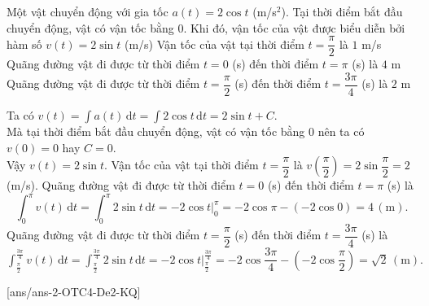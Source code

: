 \begin{ex}%
	Một vật chuyển động với gia tốc $a(t)=2\cos t$ (m/s$^2$).
	\choiceTF
	{Tại thời điểm bắt đầu chuyển động, vật có vận tốc bằng $0$. Khi đó, vận tốc của vật được biểu diễn bởi hàm số $v(t)=2\sin t$ (m/s)}
	{Vận tốc của vật tại thời điểm $t=\dfrac{\pi}{2}$ là $1$ m/s}
	{Quãng đường vật đi được từ thời điểm $t=0$ (s) đến thời điểm $t=\pi$ (s) là $4$ m}
	{Quãng đường vật đi được từ thời điểm $t=\dfrac{\pi}{2}$ (s) đến thời điểm $t=\dfrac{3\pi}{4}$ (s) là $2$ m}
	\loigiai
	{\begin{itemchoice}
	\itemch Ta có $v(t)=\displaystyle\int a(t) \mathrm{\,d}t=\displaystyle\int 2\cos t \mathrm{\,d}t=2\sin t+C$. \\
	Mà tại thời điểm bắt đầu chuyển động, vật có vận tốc bằng 0 nên ta có $v(0)=0$ hay $C=0$. \\
	Vậy $v(t)=2\sin t$.
	\itemch Vận tốc của vật tại thời điểm $t=\dfrac{\pi}{2}$ là $v\left(\dfrac{\pi}{2}\right)=2\sin \dfrac{\pi}{2}=2$ (m/s).
	\itemch Quãng đường vật đi được từ thời điểm $t=0$ (s) đến thời điểm $t=\pi$ (s) là
	$$
	\displaystyle\int_0^\pi v(t) \mathrm{\,d}t=\displaystyle\int_0^\pi 2 \sin t \mathrm{\,d}t=-\left.2 \cos t\right|_0 ^\pi=-2 \cos \pi-(-2 \cos 0)=4\,(\mathrm{m}).
	$$
	\itemch Quãng đường vật đi được từ thời điểm $t=\dfrac{\pi}{2}$ (s) đến thời điểm $t=\dfrac{3\pi}{4}$ (s) là
	$\displaystyle\int_{\frac{\pi}{2}}^{\frac{3 \pi}{4}} v(t) \mathrm{\,d}t
	=\displaystyle\int_{\frac{\pi}{2}}^{\frac{3 \pi}{4}} 2 \sin t \mathrm{\,d}t
	=-2 \cos t\Big| _{\frac{\pi}{2}} ^{\frac{3 \pi}{4}}
	=-2 \cos \dfrac{3\pi}{4}-\left(-2 \cos \dfrac{\pi}{2}\right)
	=\sqrt{2}\,(\mathrm{m}).$
	\end{itemchoice}
	}
\end{ex}
[ans/ans-2-OTC4-De2-KQ]
\caukq
